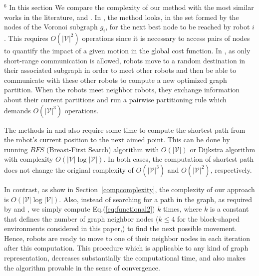 \documentclass[smallcondensed]{svjour3}
\begin{document}
{\color{blue}$^6$
In this section We compare the complexity of our method with the most similar works in the literature, \citep{Durham2012} and \citep{Yun2013}. 
%
In \cite{Yun2013}, the method looks, in the set formed by the nodes of the Voronoi subgraph $g_i$, for the next best node to be reached by robot $i$.  This requires $O(|\mathcal{V}|^2)$ operations since it is necessary to access pairs of nodes to quantify the impact of a given motion in the global cost function. 
%
In \citep{Durham2012}, as only short-range communication is allowed, robots move to a random destination in their associated subgraph in order to meet other robots and then be able to communicate with these other robots to compute a new optimized graph partition. When the robots meet neighbor robots, they exchange information about their current partitions and run a pairwise partitioning rule which demands $O(|\mathcal{V}|^3)$ operations. %

The methods in \citep{Durham2012} and \citep{Yun2013} also require some time to compute the shortest path from the robot's current position to the next aimed point. This can be done by running $BFS$ (Breast-First Search) algorithm with $O(|\mathcal{V}|)$ or Dijkstra algorithm with complexity $O(|\mathcal{V}| \log |\mathcal{V}|)$. In both cases, the computation of shortest path does not change the original complexity of $O(|\mathcal{V}|^3)$ and $O(|\mathcal{V}|^2)$, respectively.

 In contrast, as show in Section~\ref{compcomplexity}, the complexity of our approach is $O(|\mathcal{V}| \log |\mathcal{V}|)$. Also, instead of searching for a path in the graph, as required by \citep{Durham2012} and \citep{Yun2013}, we simply compute Eq.(\ref{eq:functional2}) $k$ times, where $k$ is a constant that defines the number of graph neighbor nodes ($k \leq 4$ for the block-shaped environments considered in this paper,) to find the next possible movement. Hence, robots are ready to move to one of their neighbor nodes in each iteration after this computation. This procedure which is applicable to any kind of graph representation, decreases substantially the computational time, and also makes the algorithm provable in the sense of convergence.

}
\end{document}
